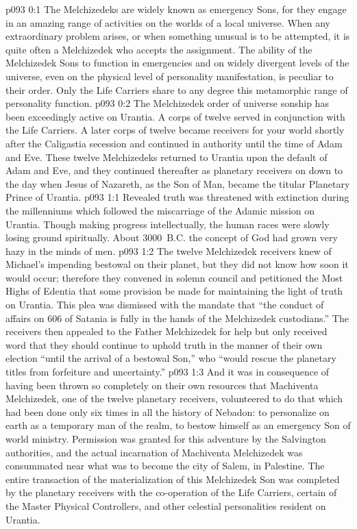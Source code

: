 \author{Melchizedek}
\vs p093 0:1 The Melchizedeks are widely known as emergency Sons, for they engage in an amazing range of activities on the worlds of a local universe. When any extraordinary problem arises, or when something unusual is to be attempted, it is quite often a Melchizedek who accepts the assignment. The ability of the Melchizedek Sons to function in emergencies and on widely divergent levels of the universe, even on the physical level of personality manifestation, is peculiar to their order. Only the Life Carriers share to any degree this metamorphic range of personality function.
\pc \vs p093 0:2 The Melchizedek order of universe sonship has been exceedingly active on Urantia. A corps of twelve served in conjunction with the Life Carriers. A later corps of twelve became receivers for your world shortly after the Caligastia secession and continued in authority until the time of Adam and Eve. These twelve Melchizedeks returned to Urantia upon the default of Adam and Eve, and they continued thereafter as planetary receivers on down to the day when Jesus of Nazareth, as the Son of Man, became the titular Planetary Prince of Urantia.
\vs p093 1:1 Revealed truth was threatened with extinction during the millenniums which followed the miscarriage of the Adamic mission on Urantia. Though making progress intellectually, the human races were slowly losing ground spiritually. About 3000~B.C. the concept of God had grown very hazy in the minds of men.
\vs p093 1:2 The twelve Melchizedek receivers knew of Michael’s impending bestowal on their planet, but they did not know how soon it would occur; therefore they convened in solemn council and petitioned the Most Highs of Edentia that some provision be made for maintaining the light of truth on Urantia. This plea was dismissed with the mandate that “the conduct of affairs on 606 of Satania is fully in the hands of the Melchizedek custodians.” The receivers then appealed to the Father Melchizedek for help but only received word that they should continue to uphold truth in the manner of their own election “until the arrival of a bestowal Son,” who “would rescue the planetary titles from forfeiture and uncertainty.”
\vs p093 1:3 And it was in consequence of having been thrown so completely on their own resources that Machiventa Melchizedek, one of the twelve planetary receivers, volunteered to do that which had been done only six times in all the history of Nebadon: to personalize on earth as a temporary man of the realm, to bestow himself as an emergency Son of world ministry. Permission was granted for this adventure by the Salvington authorities, and the actual incarnation of Machiventa Melchizedek was consummated near what was to become the city of Salem, in Palestine. The entire transaction of the materialization of this Melchizedek Son was completed by the planetary receivers with the co\hyp{}operation of the Life Carriers, certain of the Master Physical Controllers, and other celestial personalities resident on Urantia.

